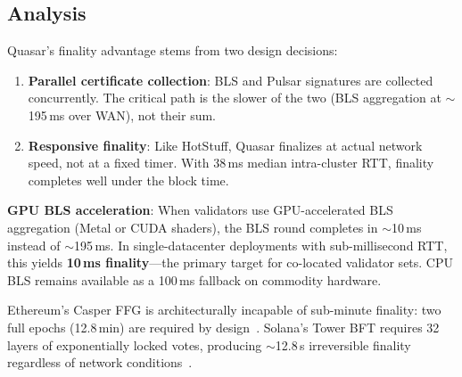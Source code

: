 \subsection{Analysis}

Quasar's finality advantage stems from two design decisions:

\begin{enumerate}
\item \textbf{Parallel certificate collection}: BLS and Pulsar signatures are collected
      concurrently. The critical path is the slower of the two (BLS aggregation at
      $\sim$195\,ms over WAN), not their sum.
\item \textbf{Responsive finality}: Like HotStuff, Quasar finalizes at actual network
      speed, not at a fixed timer. With 38\,ms median intra-cluster RTT, finality
      completes well under the block time.
\end{enumerate}

\textbf{GPU BLS acceleration}: When validators use GPU-accelerated BLS aggregation
(Metal or CUDA shaders), the BLS round completes in $\sim$10\,ms instead of
$\sim$195\,ms. In single-datacenter deployments with sub-millisecond RTT, this
yields \textbf{10\,ms finality}---the primary target for co-located validator sets.
CPU BLS remains available as a 100\,ms fallback on commodity hardware.

Ethereum's Casper FFG is architecturally incapable of sub-minute finality: two full
epochs (12.8\,min) are required by design~\cite{casper-ffg}. Solana's Tower BFT
requires 32 layers of exponentially locked votes, producing $\sim$12.8\,s irreversible
finality regardless of network conditions~\cite{solana-wp}.

